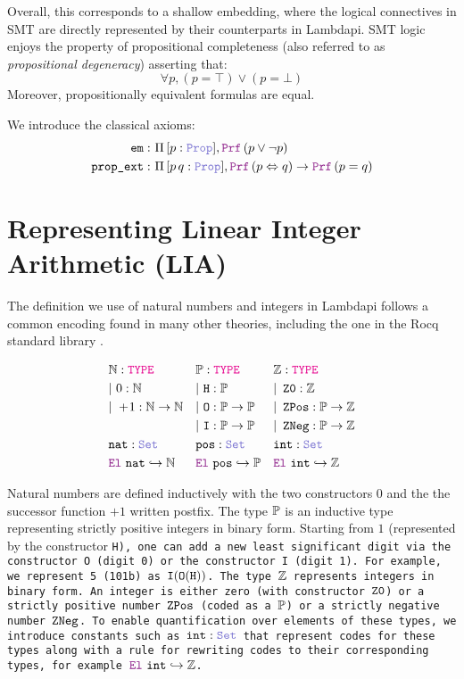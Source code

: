 Overall, this corresponds to a shallow embedding, where the logical connectives in SMT are directly represented by their counterparts in Lambdapi.
SMT logic enjoys the property of propositional completeness (also referred to as \emph{propositional degeneracy}) asserting that:
 \[
  \forall p,(p = \top) \lor (p = \bot) 
\]
Moreover, propositionally equivalent formulas are equal.

\begin{definition}
We introduce the classical axioms:
\begin{align*}
\texttt{em}:\ & \Pi\, [p: \prop], \prf\,(p \lor \neg p) \\
\texttt{prop\_ext}:\ & \Pi\, [p\,q: \prop], \prf\,(p \Leftrightarrow q ) \rightarrow \prf\,(p = q)
\end{align*}
\label{def:classical-facts}
\end{definition}

\section{Representing Linear Integer Arithmetic (\textbf{\uppercase{LIA}})}
\label{ssec:encoding-lia}

\begin{definition}\label{def:ints}
The definition we use of natural numbers and integers in Lambdapi follows a common encoding found in many other theories, including the one in the Rocq standard library \cite{Rocq-refman}.

\begin{align*}\label{eq:eq1}
&\N: \type & &\bb{P}: \type & &\Z: \type \\
&|~0: \N  & &|~\tt{H} : \bb{P} & &|~\ZO: \Z \\
&|~+\!1:\N \ra \N & &|~\tt{O}: \bb{P} \ra \bb{P} & &|~\ZPos: \bb{P} \ra \Z \\
& & &|~\tt{I}: \bb{P} \ra \bb{P} & &|~\ZNeg: \bb{P} \ra \Z \\
&\tt{nat}: \set & &\tt{pos}: \set & &\tt{int}: \set \\
&\el~\tt{nat} \re \N & &\el~\tt{pos} \re \bb{P} & &\el~\tt{int} \re \Z 
\end{align*}

Natural numbers are defined inductively with the two constructors $0$ and the the successor function $+\!1$ written postfix.
The type $\bb{P}$  is an inductive type representing strictly positive integers in binary form.
Starting from $1$ (represented by the constructor \tt{H}), one can add a new least significant digit via the constructor \tt{O} (digit 0) or the constructor \tt{I} (digit 1).
For example, we represent 5 (101b) as $\tt{I} (\tt{O} (\tt{H}))$. The type $\Z$ represents integers in binary form.
An integer is either zero (with constructor $\ZO$) or a strictly positive number $\ZPos$ (coded as a $\bb{P}$) or a strictly negative number $\ZNeg$.
To enable quantification over elements of these types, we introduce constants such as $\tt{int}:\set$ that represent codes for these types along with a rule for rewriting codes to their corresponding types, for example $\el~\tt{int} \re \Z$.
\end{definition}

